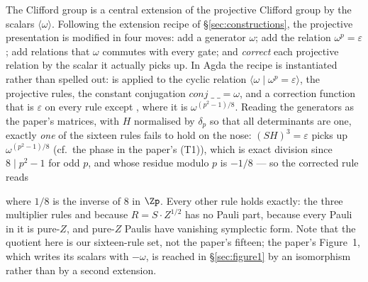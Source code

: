 The Clifford group is a central extension of the projective Clifford
group by the scalars $\langle\omega\rangle$.  Following the extension
recipe of \S\ref{sec:constructions}, the projective presentation is
modified in four moves: add a generator $\omega$; add the relation
$\omega^{p} = \varepsilon$; add relations that $\omega$ commutes with
every gate; and \emph{correct} each projective relation by the scalar it
actually picks up.  In Agda the recipe is instantiated rather than
spelled out:  is applied to the cyclic
relation $\langle \omega \mid \omega^{p} = \varepsilon\rangle$, the
projective rules, the constant conjugation $\mathit{conj}\;\_\;\_ =
\omega$, and a correction function that is $\varepsilon$ on every rule
except , where it is $\omega^{(p^2-1)/8}$.  Reading the
generators as the paper's matrices, with $H$ normalised by
$\delta_p$ so that all determinants are one, exactly \emph{one} of the
sixteen rules fails to hold on the nose: $(SH)^3 = \varepsilon$ picks
up $\omega^{(p^2-1)/8}$ (cf.\ the phase in the paper's (T1)), which is
exact division since $8 \mid p^2 - 1$ for odd $p$, and whose residue
modulo $p$ is $-1/8$ --- so the corrected rule reads
\begin{center}
\end{center}
where $1/8$ is the inverse of $8$ in $\Zp$.  Every other rule holds
exactly: the three multiplier rules and  because $R = S
\cdot Z^{1/2}$ has no Pauli part,  because every Pauli in
it is pure-$Z$, and pure-$Z$ Paulis have vanishing symplectic form.  Note that the quotient here is
our sixteen-rule set, not the paper's fifteen; the paper's Figure~1,
which writes its scalars with $-\omega$, is reached in
\S\ref{sec:figure1} by an isomorphism rather than by a second
extension.


